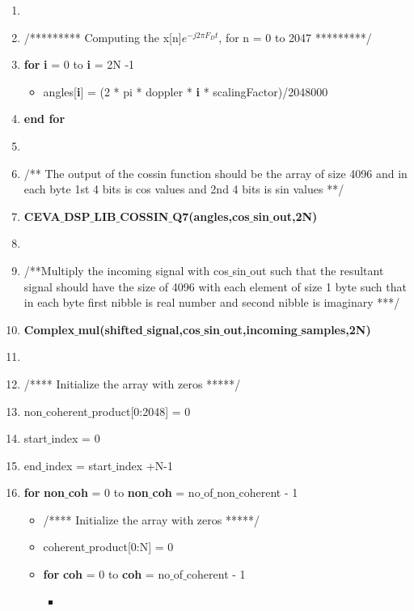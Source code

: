 \documentclass[journal,10pt,onecolumn]{article}
\begin{document}
\begin{itemize}
\begin{enumerate}
\begin{enumerate}
        \item[] 
        \item[]  /********* Computing the x[n]$e^{-j2 \pi F_Dt}$, for n = 0 to 2047 *********/
        \item[] \textbf{for} \textbf{i} = 0 to \textbf{i} = 2N -1
        \begin{itemize}
            \item[] angles[\textbf{i}] = (2 * pi * doppler * \textbf{i} * scalingFactor)/2048000
        \end{itemize}
        \item[] \textbf{end for}
        \item[] 
        \item[] /** The output of the cossin function should be the array of size 4096 and in each byte 1st 4 bits is cos values and 2nd 4 bits is sin values **/
        \item[] \textbf{CEVA$\_$DSP$\_$LIB$\_$COSSIN$\_$Q7(angles,cos$\_$sin$\_$out,2N)}
        \item[]
        \item[] /**Multiply the incoming signal with cos$\_$sin$\_$out such that the resultant signal should have the size of 4096 with each element of size 1 byte such that in each byte first nibble is real number and second nibble is imaginary ***/
        \item[] \textbf{Complex$\_$mul(shifted$\_$signal,cos$\_$sin$\_$out,incoming$\_$samples,2N)}
        \item[] 
        \item[] /**** Initialize the array with zeros *****/
        \item[] non$\_$coherent$\_$product[0:2048] = 0
        \item[] start$\_$index = 0
        \item[] end$\_$index = start$\_$index +N-1
        \item[] \textbf{for}  \textbf{non$\_$coh} = 0 to  \textbf{non$\_$coh} =  no$\_$of$\_$non$\_$coherent - 1
        \begin{itemize}
            \item[] /**** Initialize the array with zeros *****/
            \item[] coherent$\_$product[0:N] = 0
            \item[] \textbf{for} \textbf{coh} = 0 to  \textbf{coh} = no$\_$of$\_$coherent - 1
            \begin{itemize}
                \item[]

\end{itemize}
\end{itemize}
\end{enumerate}
\end{enumerate}
\end{itemize}
\end{document}
